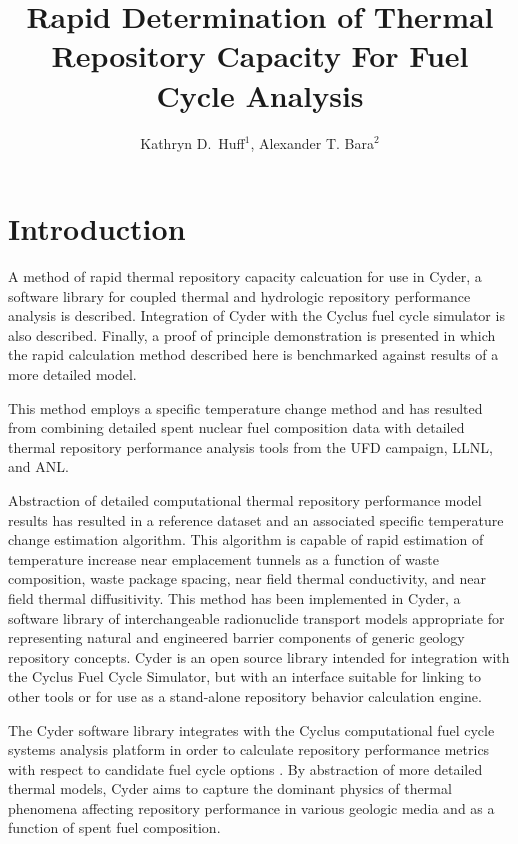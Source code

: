 \documentclass{anstrans}
\title{Rapid Determination of Thermal Repository Capacity For Fuel Cycle Analysis}
\author{Kathryn D.~Huff$^1$, Alexander T. Bara$^2$}
\institute{$^1$Univ. of Wisconsin, 1500 Engineering Dr., Madison, WI, 53706\\ 
\& Argonne National Laboratory, 9700 S. Cass Ave., Lemont, IL, katyhuff@gmail.com\\
$^2$Univ. of Illinois, Urbana Champaign, IL, 61801, bara1@illinois.edu}
\date{}
\begin{document}
\section{Introduction}

A method of rapid thermal repository capacity calcuation for use in Cyder, a 
software library for coupled thermal and hydrologic repository performance 
analysis is described. Integration of Cyder with the Cyclus fuel cycle simulator 
is also described. Finally, a proof of principle demonstration is presented in 
which the rapid calculation method described here is benchmarked against results 
of a more detailed model.

This method employs a specific temperature change method \cite{radel} and has 
resulted from combining detailed spent nuclear fuel composition data with 
detailed thermal repository performance analysis 
tools from the \gls{UFD} campaign, \gls{LLNL}, and 
\gls{ANL}\cite{radel,llnl,sinda,carter}.

Abstraction of detailed computational thermal repository performance model 
results has resulted in a reference dataset and an associated specific 
temperature change estimation algorithm. This algorithm is capable of rapid 
estimation of temperature increase near emplacement tunnels as a function of 
waste composition, waste package spacing, near field thermal conductivity, and 
near field thermal diffusitivity.  This method has been implemented in Cyder, a 
software library of interchangeable radionuclide transport models appropriate 
for representing natural and engineered barrier components of generic geology
repository concepts.  Cyder is an open source library intended for integration 
with the Cyclus Fuel Cycle Simulator, but with an interface suitable for 
linking to other tools or for use as a stand-alone repository behavior 
calculation engine. 

The Cyder software library integrates with 
the Cyclus computational fuel cycle systems analysis platform in order to 
calculate repository performance metrics with respect to candidate fuel cycle 
options \cite{huff_cyder_2012,huff_cyclus:_2010}. By abstraction of more 
detailed thermal models, Cyder aims to capture the dominant 
physics of thermal phenomena affecting repository performance in 
various geologic media and as a function of spent fuel composition.
\end{document}
